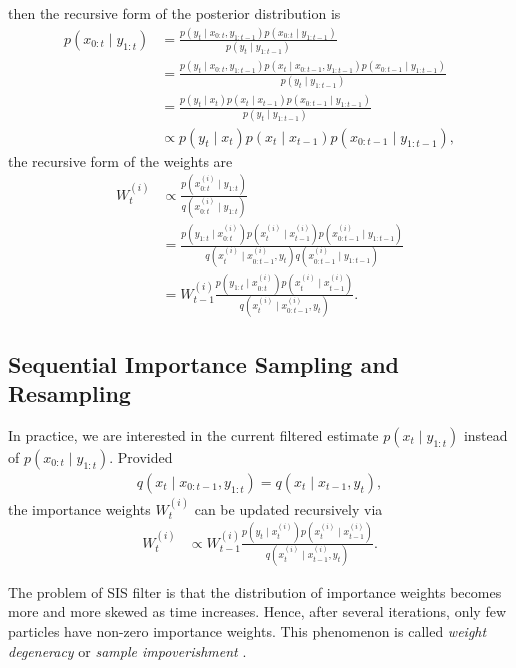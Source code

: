 then the recursive form of the posterior distribution is 
\begin{align*}
p(x_{0:t}\mid y_{1:t}) &= \frac{p(y_t \mid x_{0:t},y_{1:t-1})p(x_{0:t}\mid y_{1:t-1})}{p(y_t \mid y_{1:t-1})}\\
&= \frac{p(y_t \mid x_{0:t},y_{1:t-1}) p(x_t \mid x_{0:t-1},y_{1:t-1}) p(x_{0:t-1}\mid y_{1:t-1} ) }{p(y_t \mid y_{1:t-1})}\\
&= \frac{p(y_t \mid x_t ) p(x_t \mid x_{t-1}) p(x_{0:t-1}\mid y_{1:t-1} ) }{p(y_t \mid y_{1:t-1})}\\
&\propto p(y_t \mid x_t ) p(x_t \mid x_{t-1}) p(x_{0:t-1}\mid y_{1:t-1} ),
\end{align*}
the recursive form of the weights are
\begin{align*}
W_t^{(i)} &\propto \frac{p\left(x_{0:t}^{(i)}\mid y_{1:t}\right)}{q\left(x_{0:t}^{(i)}\mid y_{1:t}\right)}\\
&= \frac{ p\left(y_{1:t}\mid x_{0:t}^{(i)}\right) p\left(x_{t}^{(i)}\mid x_{t-1}^{(i)}\right)  p\left(x_{0:t-1}^{(i)}\mid y_{1:t-1}\right)}   { q\left(x_{t}^{(i)}\mid x_{0:t-1}^{(i)},y_{t}\right)  q\left(x_{0:t-1}^{(i)}\mid y_{1:t-1}\right) } \\
&= W_{t-1}^{(i)} \frac{ p\left(y_{1:t}\mid x_{0:t}^{(i)}\right) p\left(x_{t}^{(i)}\mid x_{t-1}^{(i)}\right) }   {q\left(x_{t}^{(i)}\mid x_{0:t-1}^{(i)},y_{t}\right)}.
\end{align*}

\subsection{Sequential Importance Sampling and Resampling}
 
In practice, we are interested in the current filtered estimate $p(x_t \mid y_{1:t})$ instead of $p(x_{0:t}\mid y_{1:t})$. Provided 
\begin{align*}
q(x_t \mid  x_{0:t-1},y_{1:t})=q(x_t \mid  x_{t-1},y_t ),
\end{align*}
the importance weights $W_t^{(i)}$ can be updated recursively via 
\begin{align*}
W_t^{(i)} &\propto W_{t-1}^{(i)} \frac{ p\left(y_t \mid x_t^{(i)}\right) p\left(x_{t}^{(i)}\mid x_{t-1}^{(i)}\right) }   {q\left(x_{t}^{(i)}\mid x_{t-1}^{(i)},y_{t}\right)}.
\end{align*}

The problem of SIS filter is that the distribution of importance weights becomes more and more skewed as time increases. Hence, after several iterations, only few particles have non-zero importance weights. This phenomenon is called \textit{weight degeneracy} or \textit{sample impoverishment} \citep{smcmip2011}.


